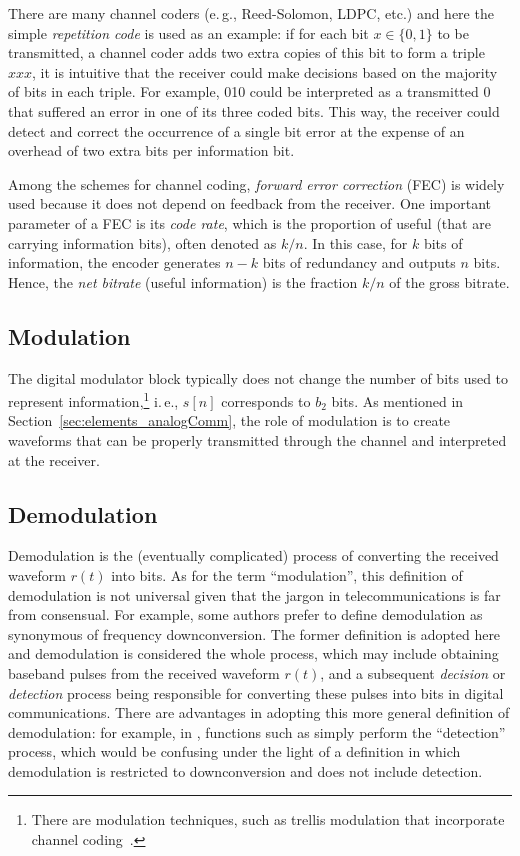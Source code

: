 There are many channel coders (e.\,g., Reed-Solomon, LDPC, etc.) and here the simple \emph{repetition code} is used as an example: if for each bit $x \in \{0,1\}$ to be transmitted, a channel coder adds two extra copies of this bit to form a triple $xxx$, it is intuitive that the receiver could make decisions based on the majority of bits in each triple. For example, 010 could be interpreted as a transmitted 0 that suffered an error in one of its three coded bits. This way, the receiver could detect and correct the occurrence of a single bit error at the expense of an overhead of two extra bits per information bit.

Among the schemes for channel coding, \emph{forward error correction} (FEC) is widely used because it does not depend on feedback from the receiver. One important parameter of a FEC is its \emph{code rate}, which is the proportion of useful (that are carrying information bits), often denoted as $k/n$. In this case, for $k$ bits of information, the encoder generates $n-k$ bits of redundancy and outputs $n$ bits. Hence, the \emph{net bitrate} (useful information) is the fraction $k/n$ of the gross bitrate.

\subsection{Modulation}
The digital modulator block typically does not change the number of bits used to represent information,\footnote{There are modulation techniques, such as trellis modulation that incorporate channel coding~\cite{Proakis07}.} i.\,e., $s[n]$ corresponds to $b_2$ bits. As mentioned in Section~\ref{sec:elements_analogComm}, the role of modulation is to create waveforms that can be properly transmitted through the channel and interpreted at the receiver. 

\subsection{Demodulation}

Demodulation is the (eventually complicated) process of converting the received waveform $r(t)$ into bits. As for the term ``modulation'', this definition of demodulation is not universal given that the jargon in telecommunications is far from consensual. For example, some authors prefer to define demodulation as
synonymous of frequency  downconversion. The former definition is adopted here and demodulation is considered the whole process, which may include obtaining baseband pulses from the received waveform $r(t)$, and  a subsequent \emph{decision} or \emph{detection} process being responsible for converting these pulses into bits in digital communications. There are advantages in adopting this more general definition of demodulation: for example, in {\matlab}, functions such as  simply perform the ``detection'' process, which would be confusing under the light of a definition in which demodulation is restricted to downconversion and does not include detection. 

